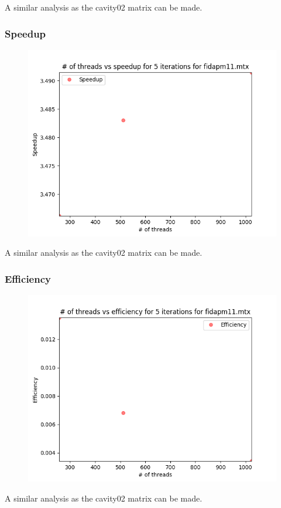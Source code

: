 \documentclass{article}
\begin{document}
\null \qquad A similar analysis as the cavity02 matrix can be made.

\subsubsection{Speedup}

\begin{figure}[H]
\centering
\includegraphics[width=\linewidth]{assets/fidapm11_thr_speedup.png}
\label{fig:test1}
\vspace{-2pt}
\end{figure}

\null \qquad A similar analysis as the cavity02 matrix can be made.

\subsubsection{Efficiency}

\begin{figure}[H]
\centering
\includegraphics[width=\linewidth]{assets/fidapm11_thr_eff.png}
\label{fig:test1}
\vspace{-2pt}
\end{figure}

\null \qquad A similar analysis as the cavity02 matrix can be made.
\end{document}
